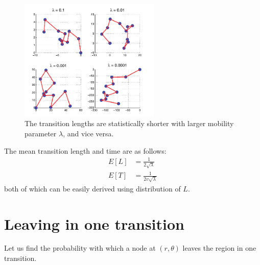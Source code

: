 \begin{figure}[h]
    \centering \vspace{-0.1in}
    \includegraphics[width=0.6\textwidth]{images/rwpTraces.png}
    \vspace{-20pt} \caption[Sample traces of rayleigh RWP mobility model]{\small The transition	lengths are statistically shorter with larger mobility parameter $\lambda$, and vice
	versa.\footnotemark}
    \label{fig:rwp}
\end{figure}
The mean transition length and time are as follows:
\begin{align}
	E[L] &= \frac{1}{2\sqrt{\lambda}} \\[2ex]
	E[T] &= \frac{1}{2v\sqrt{\lambda}}
\end{align}
both of which can be easily derived using distribution of $L$. 
\section{Leaving in  one transition}
Let us find the probability with which a node at $(r,\theta)$ leaves the region in 
one transition. 
